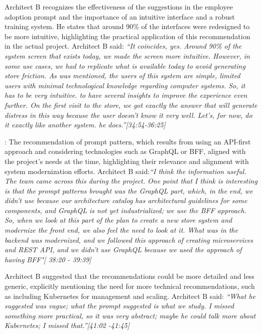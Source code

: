 Architect B recognizes the effectiveness of the suggestions in the employee adoption prompt and the importance of an intuitive interface and a robust training system. He states that around 90\% of the interfaces were redesigned to be more intuitive, highlighting the practical application of this recommendation in the actual project. Architect B said: \textit{``It coincides, yes. Around 90\% of the system screen that exists today, we made the screen more intuitive. However, in some use cases, we had to replicate what is available today to avoid generating store friction. As was mentioned, the users of this system are simple, limited users with minimal technological knowledge regarding computer systems. So, it has to be very intuitive. to have several insights to improve the experience even further. On the first visit to the store, we got exactly the answer that will generate distress in this way because the user doesn't know it very well. Let's, for now, do it exactly like another system. he does.''[34:54-36:25]}

: The recommendation of prompt pattern, which results from using an API-first approach and considering technologies such as GraphQL or BFF, aligned with the project's needs at the time, highlighting their relevance and alignment with system modernization efforts. Architect B said:\textit{``I think the information useful. The team came across this during the project. One point that I think is interesting is that the prompt patterns brought was the GraphQL part, which, in the end, we didn't use because our architecture catalog has architectural guidelines for some components, and GraphQL is not yet industrialized; we use the BFF approach. So, when we look at this part of the plan to create a new store system and modernize the front end, we also feel the need to look at it. What was in the backend was modernized, and we followed this approach of creating microservices and REST API, and we didn't use GraphQL because we used the approach of having BFF"[ 38:20 - 39:39]}


Architect B suggested that the recommendations could be more detailed and less generic, explicitly mentioning the need for more technical recommendations, such as including Kubernetes for management and scaling. Architect B said: \textit{``What he suggested was vague; what the prompt suggested is what we study. I missed something more practical, so it was very abstract; maybe he could talk more about Kubernetes; I missed that.''[41:02 -41:45]
}


